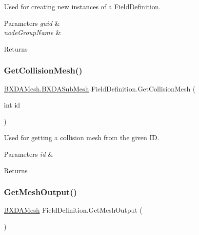 Used for creating new instances of a \hyperlink{class_field_definition}{Field\+Definition}. 


\begin{DoxyParams}{Parameters}
{\em guid} & \\
\hline
{\em node\+Group\+Name} & \\
\hline
\end{DoxyParams}
\begin{DoxyReturn}{Returns}

\end{DoxyReturn}
\mbox{\label{class_field_definition_aefa6070137fba9ec6bfb67f3b2639e68}} 
\subsubsection{\texorpdfstring{Get\+Collision\+Mesh()}{GetCollisionMesh()}}
{\footnotesize\ttfamily \hyperlink{class_b_x_d_a_mesh_1_1_b_x_d_a_sub_mesh}{B\+X\+D\+A\+Mesh.\+B\+X\+D\+A\+Sub\+Mesh} Field\+Definition.\+Get\+Collision\+Mesh (\begin{DoxyParamCaption}\item[{int}]{id }\end{DoxyParamCaption})}



Used for getting a collision mesh from the given ID. 


\begin{DoxyParams}{Parameters}
{\em id} & \\
\hline
\end{DoxyParams}
\begin{DoxyReturn}{Returns}

\end{DoxyReturn}
\mbox{\label{class_field_definition_a7d7ef7581f135c46488b48c79f3070fe}} 
\subsubsection{\texorpdfstring{Get\+Mesh\+Output()}{GetMeshOutput()}}
{\footnotesize\ttfamily \hyperlink{class_b_x_d_a_mesh}{B\+X\+D\+A\+Mesh} Field\+Definition.\+Get\+Mesh\+Output (\begin{DoxyParamCaption}{ }\end{DoxyParamCaption})}



